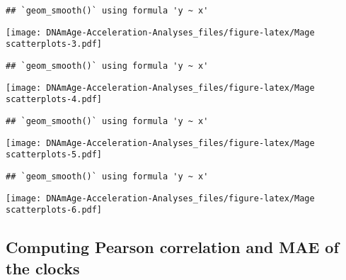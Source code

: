 \documentclass[]{article}
\begin{document}
\begin{verbatim}
## `geom_smooth()` using formula 'y ~ x'
\end{verbatim}

\texttt{[image: DNAmAge-Acceleration-Analyses\_files/figure-latex/Mage scatterplots-3.pdf]}

\begin{verbatim}
## `geom_smooth()` using formula 'y ~ x'
\end{verbatim}

\texttt{[image: DNAmAge-Acceleration-Analyses\_files/figure-latex/Mage scatterplots-4.pdf]}

\begin{verbatim}
## `geom_smooth()` using formula 'y ~ x'
\end{verbatim}

\texttt{[image: DNAmAge-Acceleration-Analyses\_files/figure-latex/Mage scatterplots-5.pdf]}

\begin{verbatim}
## `geom_smooth()` using formula 'y ~ x'
\end{verbatim}

\texttt{[image: DNAmAge-Acceleration-Analyses\_files/figure-latex/Mage scatterplots-6.pdf]}

\subsection{Computing Pearson correlation and MAE of the
clocks}\label{computing-pearson-correlation-and-mae-of-the-clocks}
\end{document}
